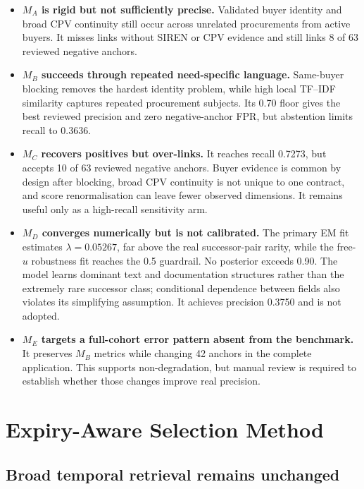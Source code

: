 \documentclass[11pt,a4paper]{article}
\begin{document}
\begin{itemize}
  \item \textbf{$M_A$ is rigid but not sufficiently precise.} Validated buyer identity
  and broad CPV continuity still occur across unrelated procurements from active
  buyers. It misses links without SIREN or CPV evidence and still links 8 of 63
  reviewed negative anchors.
  \item \textbf{$M_B$ succeeds through repeated need-specific language.} Same-buyer
  blocking removes the hardest identity problem, while high local TF--IDF similarity
  captures repeated procurement subjects. Its 0.70 floor gives the best reviewed
  precision and zero negative-anchor FPR, but abstention limits recall to 0.3636.
  \item \textbf{$M_C$ recovers positives but over-links.} It reaches recall 0.7273,
  but accepts 10 of 63 reviewed negative anchors. Buyer evidence is common by design
  after blocking, broad CPV continuity is not unique to one contract, and score
  renormalisation can leave fewer observed dimensions. It remains useful only as a
  high-recall sensitivity arm.
  \item \textbf{$M_D$ converges numerically but is not calibrated.} The primary EM fit
  estimates $\lambda=0.05267$, far above the real successor-pair rarity, while the
  free-$u$ robustness fit reaches the 0.5 guardrail. No posterior exceeds 0.90. The
  model learns dominant text and documentation structures rather than the extremely
  rare successor class; conditional dependence between fields also violates its
  simplifying assumption. It achieves precision 0.3750 and is not adopted.
  \item \textbf{$M_E$ targets a full-cohort error pattern absent from the benchmark.}
  It preserves $M_B$ metrics while changing 42 anchors in the complete application.
  This supports non-degradation, but manual review is required to establish whether
  those changes improve real precision.
\end{itemize}

\section{Expiry-Aware Selection Method}
\label{sec:expiry-method}

\subsection{Broad temporal retrieval remains unchanged}
\end{document}
